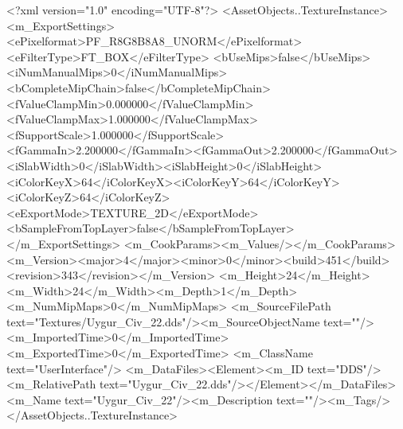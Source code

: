 <?xml version="1.0" encoding="UTF-8"?>
<AssetObjects..TextureInstance>
  <m_ExportSettings>
    <ePixelformat>PF_R8G8B8A8_UNORM</ePixelformat><eFilterType>FT_BOX</eFilterType>
    <bUseMips>false</bUseMips><iNumManualMips>0</iNumManualMips><bCompleteMipChain>false</bCompleteMipChain>
    <fValueClampMin>0.000000</fValueClampMin><fValueClampMax>1.000000</fValueClampMax><fSupportScale>1.000000</fSupportScale>
    <fGammaIn>2.200000</fGammaIn><fGammaOut>2.200000</fGammaOut><iSlabWidth>0</iSlabWidth><iSlabHeight>0</iSlabHeight>
    <iColorKeyX>64</iColorKeyX><iColorKeyY>64</iColorKeyY><iColorKeyZ>64</iColorKeyZ>
    <eExportMode>TEXTURE_2D</eExportMode><bSampleFromTopLayer>false</bSampleFromTopLayer>
  </m_ExportSettings>
  <m_CookParams><m_Values/></m_CookParams>
  <m_Version><major>4</major><minor>0</minor><build>451</build><revision>343</revision></m_Version>
  <m_Height>24</m_Height><m_Width>24</m_Width><m_Depth>1</m_Depth><m_NumMipMaps>0</m_NumMipMaps>
  <m_SourceFilePath text="Textures/Uygur_Civ_22.dds"/><m_SourceObjectName text=""/>
  <m_ImportedTime>0</m_ImportedTime><m_ExportedTime>0</m_ExportedTime>
  <m_ClassName text="UserInterface"/>
  <m_DataFiles><Element><m_ID text="DDS"/><m_RelativePath text="Uygur_Civ_22.dds"/></Element></m_DataFiles>
  <m_Name text="Uygur_Civ_22"/><m_Description text=""/><m_Tags/>
</AssetObjects..TextureInstance>
